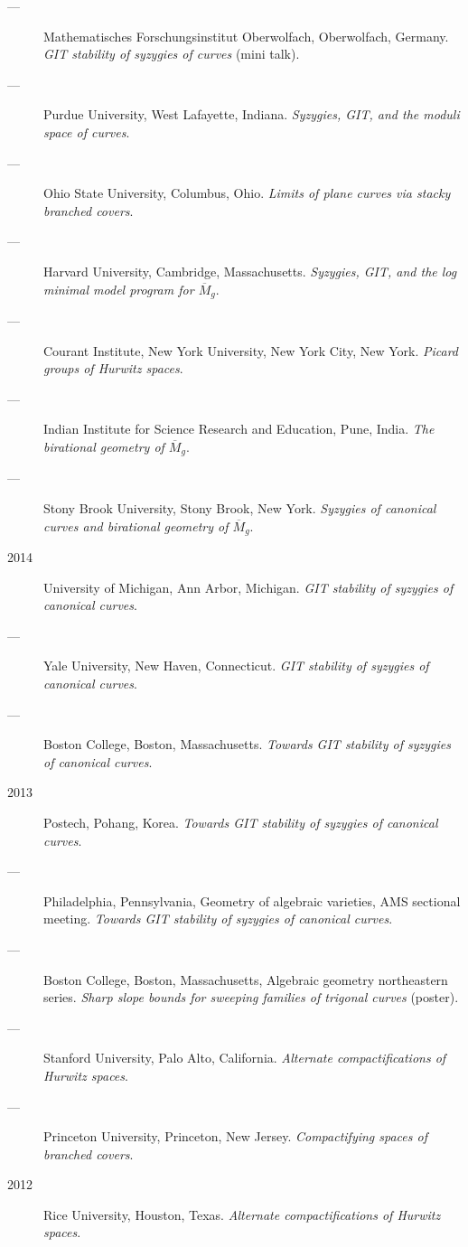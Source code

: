 \documentclass[11pt]{article}
\begin{document}
\begin{description}
\item[{---}] Mathematisches Forschungsinstitut Oberwolfach, Oberwolfach, Germany. \emph{GIT stability of syzygies of curves} (mini talk).
\item[{---}] Purdue University, West Lafayette, Indiana. \emph{Syzygies, GIT, and the moduli space of curves}.
\item[{---}] Ohio State University, Columbus, Ohio. \emph{Limits of plane curves via stacky branched covers}.
\item[{---}] Harvard University, Cambridge, Massachusetts. \emph{Syzygies, GIT, and the log minimal model program for \(\overline{M}_g\)}.
\item[{---}] Courant Institute, New York University, New York City, New York. \emph{Picard groups of Hurwitz spaces}.
\item[{---}] Indian Institute for Science Research and Education, Pune, India. \emph{The birational geometry of \(\overline M_g\)}.
\item[{---}] Stony Brook University, Stony Brook, New York. \emph{Syzygies of canonical curves and birational geometry of \(\overline M_g\)}.
\item[{2014}] University of Michigan, Ann Arbor, Michigan. \emph{GIT stability of syzygies of canonical curves}.
\item[{---}] Yale University, New Haven, Connecticut. \emph{GIT stability of syzygies of canonical curves}.
\item[{---}] Boston College, Boston, Massachusetts. \emph{Towards GIT stability of syzygies of canonical curves}.
\item[{2013}] Postech, Pohang, Korea. \emph{Towards GIT stability of syzygies of canonical curves}.
\item[{---}] Philadelphia, Pennsylvania, Geometry of algebraic varieties, AMS sectional meeting. \emph{Towards GIT stability of syzygies of canonical curves}.
\item[{---}] Boston College, Boston, Massachusetts, Algebraic geometry northeastern series. \emph{Sharp slope bounds for sweeping families of trigonal curves} (poster).
\item[{---}] Stanford University, Palo Alto, California. \emph{Alternate compactifications of Hurwitz spaces}.
\item[{---}] Princeton University, Princeton, New Jersey. \emph{Compactifying spaces of branched covers}.
\item[{2012}] Rice University, Houston, Texas. \emph{Alternate compactifications of Hurwitz spaces}.

\end{description}
\end{document}

